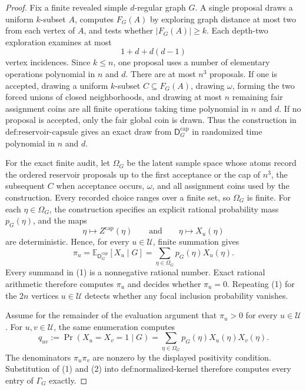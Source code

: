 \documentclass{article}
\begin{document}
\begin{proof}
Fix a finite revealed simple \(d\)-regular graph \(G\). A single proposal draws a uniform \(k\)-subset \(A\), computes \(F_G(A)\) by exploring graph distance at most two from each vertex of \(A\), and tests whether \(\lvert F_G(A)\rvert\ge k\). Each depth-two exploration examines at most
\[
1+d+d(d-1)
\]
vertex incidences. Since \(k\le n\), one proposal uses a number of elementary operations polynomial in \(n\) and \(d\). There are at most \(n^3\) proposals. If one is accepted, drawing a uniform \(k\)-subset \(C\subseteq F_G(A)\), drawing \(\omega\), forming the two forced unions of closed neighborhoods, and drawing at most \(n\) remaining fair assignment coins are all finite operations taking time polynomial in \(n\) and \(d\). If no proposal is accepted, only the fair global coin is drawn. Thus the construction in \(\text{def:reservoir-capsule}\) gives an exact draw from \(\mathsf D_G^{\mathrm{cap}}\) in randomized time polynomial in \(n\) and \(d\).

For the exact finite audit, let \(\Omega_G\) be the latent sample space whose atoms record the ordered reservoir proposals up to the first acceptance or the cap of \(n^3\), the subsequent \(C\) when acceptance occurs, \(\omega\), and all assignment coins used by the construction. Every recorded choice ranges over a finite set, so \(\Omega_G\) is finite. For each \(\eta\in\Omega_G\), the construction specifies an explicit rational probability mass \(p_G(\eta)\), and the maps
\[
\eta\longmapsto Z^{\mathrm{cap}}(\eta)
\qquad\text{and}\qquad
\eta\longmapsto X_u(\eta)
\]
are deterministic. Hence, for every \(u\in\mathcal U\), finite summation gives
\[
\pi_u
=\mathbb E_{\mathsf D_G^{\mathrm{cap}}}[X_u\mid G]
=\sum_{\eta\in\Omega_G}p_G(\eta)X_u(\eta).
\tag{1}
\]
Every summand in (1) is a nonnegative rational number. Exact rational arithmetic therefore computes \(\pi_u\) and decides whether \(\pi_u=0\). Repeating (1) for the \(2n\) vertices \(u\in\mathcal U\) detects whether any focal inclusion probability vanishes.

Assume for the remainder of the evaluation argument that \(\pi_u>0\) for every \(u\in\mathcal U\). For \(u,v\in\mathcal U\), the same enumeration computes
\[
q_{uv}
:=\Pr(X_u=X_v=1\mid G)
=\sum_{\eta\in\Omega_G}p_G(\eta)X_u(\eta)X_v(\eta).
\tag{2}
\]
The denominators \(\pi_u\pi_v\) are nonzero by the displayed positivity condition. Substitution of (1) and (2) into \(\text{def:normalized-kernel}\) therefore computes every entry of \(\Gamma_G\) exactly.


\end{proof}
\end{document}
